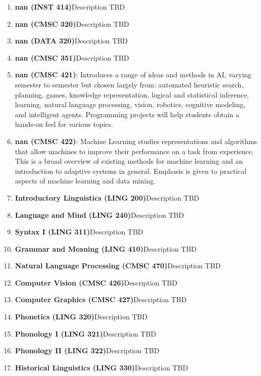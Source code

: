 \begin{enumerate}
\item \textbf{nan (INST 414)}Description TBD
\item \textbf{nan (CMSC 320)}Description TBD
\item \textbf{nan (DATA 320)}Description TBD
\item \textbf{nan (CMSC 351)}Description TBD
\item \textbf{nan (CMSC 421)}: Introduces a range of ideas and methods in AI, varying semester to semester but chosen largely from: automated heuristic search, planning, games, knowledge representation, logical and statistical inference, learning, natural language processing, vision, robotics, cognitive modeling, and intelligent agents. Programming projects will help students obtain a hands-on feel for various topics.
\item \textbf{nan (CMSC 422)}: Machine Learning studies representations and algorithms that allow machines to improve their performance on a task from experience. This is a broad overview of existing methods for machine learning and an introduction to adaptive systems in general. Emphasis is given to practical aspects of machine learning and data mining.
\item \textbf{Introductory Linguistics (LING 200)}Description TBD
\item \textbf{Language and Mind (LING 240)}Description TBD
\item \textbf{Syntax I (LING 311)}Description TBD
\item \textbf{Grammar and Meaning (LING 410)}Description TBD
\item \textbf{Natural Language Processing (CMSC 470)}Description TBD
\item \textbf{Computer Vision (CMSC 426)}Description TBD
\item \textbf{Computer Graphics (CMSC 427)}Description TBD
\item \textbf{Phonetics (LING 320)}Description TBD
\item \textbf{Phonology I (LING 321)}Description TBD
\item \textbf{Phonology II (LING 322)}Description TBD
\item \textbf{Historical Linguistics (LING 330)}Description TBD
\end{enumerate}